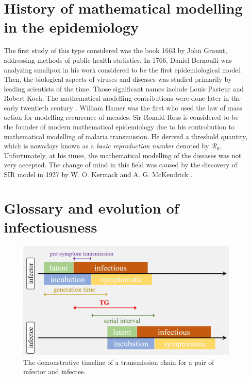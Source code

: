 \documentclass[
  digital, %
  table,   %
  twoside, %
  12pt,
  lof,     %
  lot,     %
]{fithesis3}
\begin{document}
\section{History of mathematical modelling in the epidemiology}

The first study of this type considered was the book 1663 by 
John Graunt, addressing methods of public health statistics.
In 1766, Daniel Bernoulli was analyzing smallpox in his work 
considered to be the first epidemiological model.
Then, the biological aspects of viruses and diseases was 
studied primarily by leading scientists of the time.
Those significant names include Louis Pasteur and Robert Koch.
The mathematical modelling contributions were done later in
the early twentieth century \cite[Chapter~1.4]{martcheva2015}.
William Hamer was the first who used the law of 
mass action for modelling recurrence of measles. 
Sir Ronald Ross is considered to be the founder of 
modern mathematical epidemiology due to his controbution
to mathematical modelling of malaria
transmission. He derived a threshold quantity, which is 
nowadays known as a \textit{basic reproduction number}
denoted by $\mathcal{R}_0$.
Unfortunately, at his times, the mathematical modelling 
of the diseases was not very accepted.
The change of mind in this field was caused by the discovery 
of SIR model in 1927 by W. O. Kermack and 
A. G. McKendrick \cite{kermack1927}.


\section{Glossary and evolution of infectiousness}

\begin{figure}[h]
  \begin{center}
    \includegraphics[width=\textwidth]{images/zhao2020_terms.png}
  \end{center}
  \caption{The demonstrative timeline of a transmission chain for a pair of infector and infectee. \cite{zhao2020}}
  \label{fig:zhao-transmissive-chain-example}
\end{figure}
\end{document}
